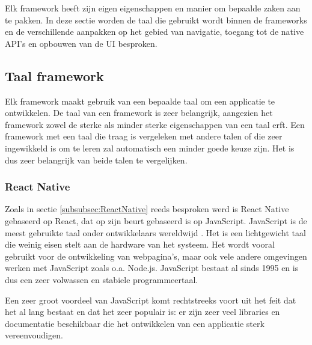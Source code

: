 Elk framework heeft zijn eigen eigenschappen en manier om bepaalde zaken aan te
pakken. In deze sectie worden de taal die gebruikt wordt binnen de frameworks en
de verschillende aanpakken op het gebied van navigatie, toegang tot de native
API's en opbouwen van de UI besproken.

\subsection{Taal framework}
\label{subsec:taalFramework}

Elk framework maakt gebruik van een bepaalde taal om een applicatie te
ontwikkelen. De taal van een framework is zeer belangrijk, aangezien het framework zowel de sterke als minder sterke eigenschappen van een taal erft. Een framework met
een taal die traag is vergeleken met andere talen of die zeer ingewikkeld is om
te leren zal automatisch een minder goede keuze zijn. Het is dus zeer belangrijk
van beide talen te vergelijken.

\subsubsection{React Native}
\label{subsubsec:taalReactNative}

Zoals in sectie \ref{subsubsec:ReactNative} reeds besproken werd is React Native
gebaseerd op React, dat op zijn beurt gebaseerd is op JavaScript. JavaScript is
de meest gebruikte taal onder ontwikkelaars wereldwijd \autocite{Liu2020a}. Het
is een lichtgewicht taal die weinig eisen stelt aan de hardware van het systeem.
Het wordt vooral gebruikt voor de ontwikkeling van webpagina's, maar ook vele
andere omgevingen werken met JavaScript zoals o.a. Node.js. JavaScript bestaat
al sinds 1995 en is dus een zeer volwassen en stabiele programmeertaal.

Een zeer groot voordeel van JavaScript komt rechtstreeks voort uit het feit dat
het al lang bestaat en dat het zeer populair is: er zijn zeer veel libraries en
documentatie beschikbaar die het ontwikkelen van een applicatie sterk
vereenvoudigen.

